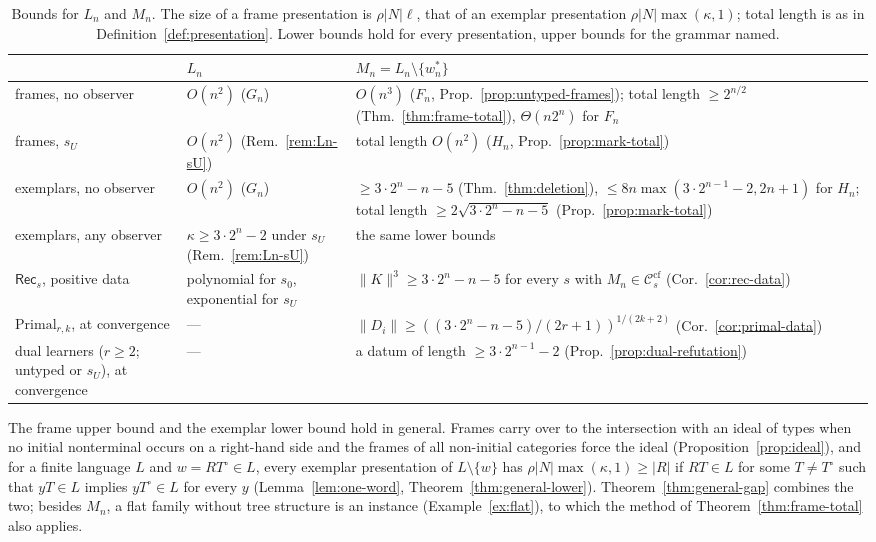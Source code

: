 \documentclass[11pt]{article}
\numberwithin{equation}{section}
\theoremstyle{plain}
\theoremstyle{definition}
\theoremstyle{remark}
\theoremstyle{plain}
\newcommand{\Ccf}[1]{\mathcal C^{\mathrm{cf}}_{#1}}
\begin{document}
\begin{table}[t]
\centering\small\renewcommand{\arraystretch}{1.15}
\caption{Bounds for $L_n$ and $M_n$.  The size of a frame presentation is
$\rho|N|\ell$, that of an exemplar presentation $\rho|N|\max(\kappa,1)$;
total length is as in Definition~\ref{def:presentation}.  Lower bounds hold
for every presentation, upper bounds for the grammar named.}
\label{tab:summary}
\begin{tabular}{@{}>{\raggedright\arraybackslash}p{3.1cm}>{\raggedright\arraybackslash}p{3.6cm}>{\raggedright\arraybackslash}p{8.6cm}@{}}
\toprule
 & $L_n$ & $M_n=L_n\setminus\{w^*_n\}$\\
\midrule
frames, no observer & $O(n^2)$ ($G_n$) & $O(n^3)$ ($F_n$, Prop.~\ref{prop:untyped-frames}); total length $\ge2^{n/2}$ (Thm.~\ref{thm:frame-total}), $\Theta(n2^n)$ for $F_n$\\
frames, $s_U$ & $O(n^2)$ (Rem.~\ref{rem:Ln-sU}) & total length $O(n^2)$ ($H_n$, Prop.~\ref{prop:mark-total})\\
exemplars, no observer & $O(n^2)$ ($G_n$) & $\ge3\cdot2^n-n-5$ (Thm.~\ref{thm:deletion}), $\le8n\max(3\cdot2^{n-1}-2,2n+1)$ for $H_n$; total length $\ge2\sqrt{3\cdot2^n-n-5}$ (Prop.~\ref{prop:mark-total})\\
exemplars, any observer & $\kappa\ge3\cdot2^n-2$ under $s_U$ (Rem.~\ref{rem:Ln-sU}) & the same lower bounds\\
$\mathsf{Rec}_s$, positive data & polynomial for $s_0$, exponential for $s_U$ \citep{kuriyama-tcs1} & $\|K\|^3\ge3\cdot2^n-n-5$ for every $s$ with $M_n\in\Ccf s$ (Cor.~\ref{cor:rec-data})\\
$\mathrm{Primal}_{r,k}$, at convergence & --- & $\|D_i\|\ge((3\cdot2^n-n-5)/(2r+1))^{1/(2k+2)}$ (Cor.~\ref{cor:primal-data})\\
dual learners ($r\ge2$; untyped or $s_U$), at convergence & --- & a datum of length $\ge3\cdot2^{n-1}-2$ (Prop.~\ref{prop:dual-refutation})\\
\bottomrule
\end{tabular}
\end{table}

The frame upper bound and the exemplar lower bound hold in general.  Frames
carry over to the intersection with an ideal of types when no initial
nonterminal occurs on a right-hand side and the frames of all non-initial
categories force the ideal (Proposition~\ref{prop:ideal}), and
for a finite language $L$ and $w=RT^\circ\in L$, every exemplar
presentation of $L\setminus\{w\}$ has $\rho|N|\max(\kappa,1)\ge|R|$ if
$RT\in L$ for some $T\ne T^\circ$ such that $yT\in L$ implies $yT^\circ\in L$
for every $y$ (Lemma~\ref{lem:one-word},
Theorem~\ref{thm:general-lower}).  Theorem~\ref{thm:general-gap} combines the
two; besides $M_n$, a flat family without tree structure is an instance
(Example~\ref{ex:flat}), to which the method of
Theorem~\ref{thm:frame-total} also applies.
\end{document}
